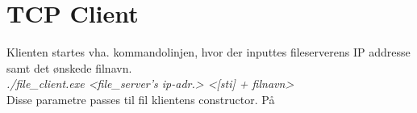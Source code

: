 \section{TCP Client}
Klienten startes vha. kommandolinjen, hvor der inputtes fileserverens IP addresse samt det ønskede filnavn. \\ \textit{./file\_client.exe  <file\_server’s ip-adr.> <[sti] + filnavn>} \\

Disse parametre passes til fil klientens constructor. På 
